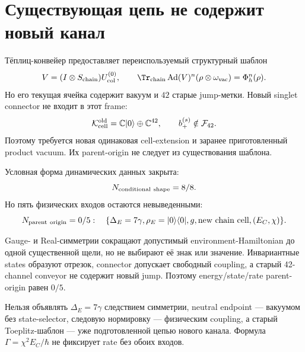 \section{Существующая цепь не содержит новый канал}

Тёплиц-конвейер предоставляет переиспользуемый структурный шаблон
\begin{equation}
 V=(I\otimes S_{\rm chain})U_{\rm col}^{(0)},
 \qquad
 \Tr_{\rm chain}\operatorname{Ad}(V)^n
 (\rho\otimes\omega_{\rm vac})=\Phi_h^n(\rho).
 \label{eq:v8-mediator-origin-chain-template}
\end{equation}
Но его текущая ячейка содержит вакуум и $42$ старые jump-метки. Новый
singlet connector не входит в этот frame:
\begin{equation}
 \mathcal K_{\rm cell}^{\rm old}=\mathbb C|0\rangle\oplus\mathbb C^{42},
 \qquad b_+^{(s)}\notin\mathcal F_{42}.
 \label{eq:v8-mediator-origin-old-chain-mismatch}
\end{equation}
Поэтому требуется новая одинаковая cell-extension и заранее приготовленный
product vacuum. Их parent-origin не следует из существования шаблона.

Условная форма динамических данных закрыта:
\begin{equation}
 N_{\rm conditional\ shape}=8/8.
 \label{eq:v8-mediator-origin-conditional-ledger}
\end{equation}
Но пять физических входов остаются невыведенными:
\begin{equation}
 N_{\rm parent\ origin}=0/5:
 \quad\{\Delta_E=7\gamma,\rho_E=|0\rangle\langle0|,
 g,\text{new chain cell},(E_C,\chi)\}.
 \label{eq:v8-mediator-origin-parent-ledger}
\end{equation}

\begin{theorem}
Gauge- и Real-симметрии сокращают допустимый environment-Hamiltonian до
одной существенной щели, но не выбирают её знак или значение. Инвариантные
states образуют отрезок, connector допускает свободный coupling, а старый
42-channel conveyor не содержит новый jump. Поэтому energy/state/rate
parent-origin равен $0/5$.
\end{theorem}

\begin{nogocriterion}
Нельзя объявлять $\Delta_E=7\gamma$ следствием симметрии, neutral endpoint
--- вакуумом без state-selector, следовую нормировку --- физическим
coupling, а старый Toeplitz-шаблон --- уже подготовленной цепью нового
канала. Формула $\Gamma=\chi^2E_C/\hbar$ не фиксирует rate без обоих входов.
\end{nogocriterion}

